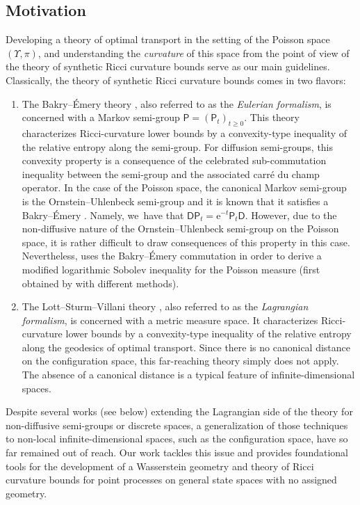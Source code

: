 \documentclass[JEP,XML,SOM,Unicode,published]{cedram}
\theoremstyle{definition}
\theoremstyle{remark}
\begin{document}
\subsection{Motivation}
Developing a theory of optimal transport in the setting of the Poisson space $(\varUpsilon, \pi)$, and understanding the \emph{curvature} of this space from the point of view of the theory of synthetic Ricci curvature bounds serve as our main guidelines.
Classically, the theory of synthetic Ricci curvature bounds comes in two flavors:
\begin{enumerate}[$(\rm i)$, wide]
\item The Bakry--Émery theory \cite{BakryEmery,BGL}, also referred to as the \emph{Eulerian formalism}, is concerned with a Markov semi-group $\mathsf{P} = (\mathsf{P}_{t})_{t \geq 0 }$.
This theory characterizes Ricci-curvature lower bounds by a convexity-type inequality of the relative entropy along the semi-group.
For diffusion semi-groups, this convexity property is a consequence of the celebrated sub-commutation inequality between the semi-group and the associated carré du champ operator.
In the case of the Poisson space, the canonical Markov semi-group is the Ornstein--Uhlenbeck semi-group and it is known that it satisfies a Bakry--Émery \cite[Lem.\,6]{LastAnaSto}.
Namely, we~have that $\mathsf{D} \mathsf{P}_{t} = \mathrm{e}^{-t} \mathsf{P}_{t} \mathsf{D}$.
However, due to the non-diffusive nature of the Ornstein--Uhlenbeck semi-group on the Poisson space, it is rather difficult to draw consequences of this property in this case.
Nevertheless, \cite{Chafai} uses the Bakry--Émery commutation in order to derive a modified logarithmic Sobolev inequality for the Poisson measure (first obtained by \cite{Wu} with different methods).

\item The Lott--Sturm--Villani theory \cite{Sturm,LottVillani,AGSDuke}, also referred to as the \emph{Lagrangian formalism}, is concerned with a metric measure space.
It characterizes Ricci-curvature lower bounds by a convexity-type inequality of the relative entropy along the geodesics of optimal transport.
Since there is no canonical distance on the configuration space, this far-reaching theory simply does not apply.
The absence of a canonical distance is a typical feature of infinite-dimensional spaces.
\end{enumerate}

Despite several works (see below) extending the Lagrangian side of the theory for non-diffusive semi-groups or discrete spaces, a generalization of those techniques to non-local infinite-dimensional spaces, such as the configuration space, have so far remained out of reach.
Our work tackles this issue and provides foundational tools for the development of a Wasserstein geometry and theory of Ricci curvature bounds for point processes on general state spaces with no assigned geometry.
\end{document}
